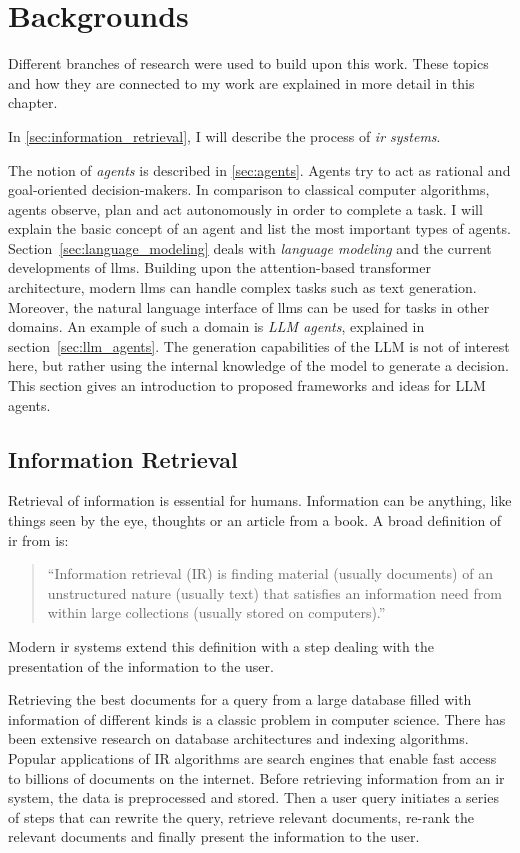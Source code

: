 \documentclass[../main.tex]{subfiles}
\begin{document}
\chapter{Backgrounds}
\label{ch:backgrounds}

Different branches of research were used to build upon this work.
These topics and how they are connected to my work
are explained in more detail in this chapter.

In \autoref{sec:information_retrieval},
I will describe the process of \emph{\gls{ir} systems}.

The notion of \emph{agents} is described in \autoref{sec:agents}.
Agents try to act as rational and goal-oriented decision-makers.
In comparison to classical computer algorithms,
agents observe, plan and act autonomously in order to complete a task.
I will explain the basic concept of an agent and list the most important types of agents.
Section~\ref{sec:language_modeling} deals with \emph{language modeling}
and the current developments of \glspl{llm}.
Building upon the attention-based transformer architecture, modern \glspl{llm}
can handle complex tasks such as text generation.
Moreover, the natural language interface of \glspl{llm} can be used for tasks in other domains.
An example of such a domain is \emph{LLM agents}, explained in section~\ref{sec:llm_agents}.
The generation capabilities of the LLM is not of interest here,
but rather using the internal knowledge of the model to generate a decision.
This section gives an introduction to proposed frameworks and ideas for LLM agents.

\section{Information Retrieval}
\label{sec:information_retrieval}
Retrieval of information is essential for humans.
Information can be anything, like things seen by the eye,
thoughts or an article from a book.
A broad definition of \gls{ir} from \cite{Manning2009} is:
\begin{quote}
    ``Information retrieval (IR) is finding material (usually documents)
    of an unstructured nature (usually text)
    that satisfies an information need
    from within large collections (usually stored on computers).''
\end{quote}
Modern \gls{ir} systems extend this definition with a step
dealing with the presentation of the information to the user.

Retrieving the best documents for a query from a large database
filled with information of different kinds is a classic problem in computer science.
There has been extensive research on database architectures and indexing algorithms.
Popular applications of IR algorithms are search engines
that enable fast access to billions of documents on the internet.
Before retrieving information from an \gls{ir} system,
the data is preprocessed and stored.
Then a user query initiates a series of steps that can rewrite the query,
retrieve relevant documents,
re-rank the relevant documents and finally present the information to the user.
\end{document}
